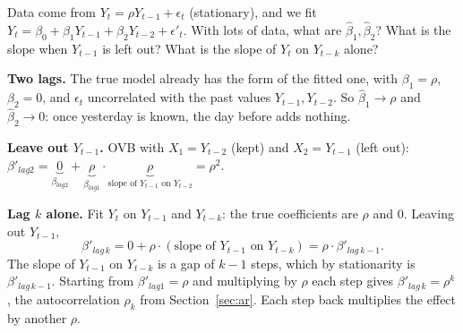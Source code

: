\documentclass[11pt]{article}
\begin{document}
\begin{examplebox}[title={Question (10/19): an AR(1) fit with extra lags, and with lag $k$ alone}]
Data come from $Y_t=\rho Y_{t-1}+\epsilon_t$ (stationary), and we fit $Y_t=\beta_0+\beta_1Y_{t-1}+\beta_2Y_{t-2}+\epsilon'_t$. With lots of data,
what are $\hat\beta_1,\hat\beta_2$? What is the slope when $Y_{t-1}$ is left out? What is the slope of $Y_t$ on $Y_{t-k}$ alone?

\textbf{Two lags.} The true model already has the form of the fitted one, with $\beta_1=\rho$, $\beta_2=0$, and $\epsilon_t$ uncorrelated with
the past values $Y_{t-1},Y_{t-2}$. So $\hat\beta_1\to\rho$ and $\hat\beta_2\to0$: once yesterday is known, the day before adds nothing.

\textbf{Leave out $Y_{t-1}$.} OVB with $X_1=Y_{t-2}$ (kept) and $X_2=Y_{t-1}$ (left out):
$\beta'_{lag2}=\underbrace{0}_{\beta_{lag2}}+\underbrace{\rho}_{\beta_{lag1}}\cdot\underbrace{\rho}_{\text{slope of }Y_{t-1}\text{ on }Y_{t-2}}=\rho^2$.

\textbf{Lag $k$ alone.} Fit $Y_t$ on $Y_{t-1}$ and $Y_{t-k}$: the true coefficients are $\rho$ and $0$. Leaving out $Y_{t-1}$,
\[
\beta'_{lag\,k}=0+\rho\cdot(\text{slope of }Y_{t-1}\text{ on }Y_{t-k})=\rho\cdot\beta'_{lag\,k-1}.
\]
The slope of $Y_{t-1}$ on $Y_{t-k}$ is a gap of $k-1$ steps, which by stationarity is $\beta'_{lag\,k-1}$. Starting from $\beta'_{lag1}=\rho$ and
multiplying by $\rho$ each step gives $\beta'_{lag\,k}=\rho^k$, the autocorrelation $\rho_k$ from Section~\ref{sec:ar}. Each step back multiplies the
effect by another $\rho$.
\end{examplebox}
\end{document}
